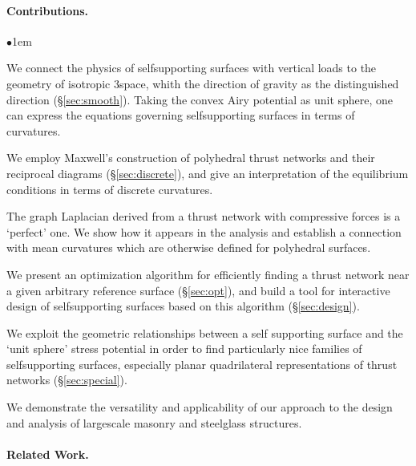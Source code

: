 \documentclass[annual]{acmsiggraph}
\newcommand{\secref}[1]{(\S\ref{#1})}
\begin{document}
\paragraph{Contributions.}

\begin{list}{$\bullet$}{\itemindent1em}

\item We connect the physics of self\dash supporting surfaces with
vertical loads to the geometry of isotropic 3\dash space, whith the
direction of gravity as the distinguished direction
\secref{sec:smooth}. Taking the convex Airy potential as
unit sphere, one can express the equations  
governing self\dash supporting surfaces in terms of curvatures.

\item We employ Maxwell's construction of polyhedral thrust networks
and their reciprocal diagrams \secref{sec:discrete}, and give
an interpretation of the equilibrium conditions in terms of
discrete curvatures.

\item The graph Laplacian derived from a thrust network with compressive
forces is a `perfect' one. We show how it appears in the analysis and
establish a connection with mean curvatures which are otherwise defined
for polyhedral surfaces.

\item We present an optimization algorithm for efficiently finding
a thrust network near a given arbitrary reference surface \secref{sec:opt},
and build a tool for interactive design of self\dash supporting surfaces based
on this algorithm \secref{sec:design}.

\item We exploit the geometric relationships between a self\dash
supporting surface and the `unit sphere' stress potential in order
to find  particularly nice families of self\dash supporting surfaces,
especially planar quadrilateral representations  of thrust networks
\secref{sec:special}.

\item We demonstrate the versatility and applicability of
our approach to the design and analysis of large\dash scale masonry and
steel\dash glass structures.

\end{list}

\paragraph{Related Work.}
\end{document}
